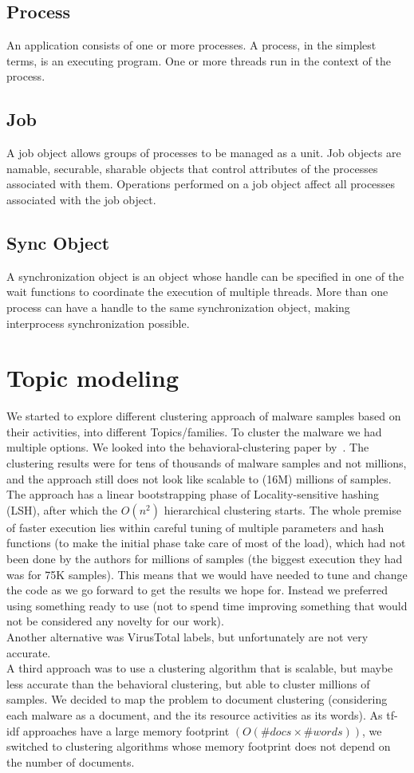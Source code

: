 \subsection{Process}
\label{sub:Process}
An application consists of one or more processes.
A process, in the simplest terms, is an executing program.
One or more threads run in the context of the process.
\subsection{Job}
\label{sub:Job}
A job object allows groups of processes to be managed as a unit.
Job objects are namable, securable, sharable objects that control attributes of the processes associated with them.
Operations performed on a job object affect all processes associated with the job object.
\subsection{Sync Object}
\label{sub:Sync Object}
A synchronization object is an object whose handle can be specified in one of the wait functions to coordinate the execution of multiple threads.
More than one process can have a handle to the same synchronization object, making interprocess synchronization possible.


\section{Topic modeling}
\label{sec:Topic model}
We started to explore different clustering approach of malware samples based on their activities, into different Topics/families.
To cluster the malware we had multiple options. We looked into the behavioral-clustering paper by~\cite[Bayer]{bayer}.
The clustering results were for tens of thousands of malware samples and not millions, and the approach still does not look like scalable to (16M) millions of samples.
The approach has a linear bootstrapping phase of Locality-sensitive hashing (LSH), after which the $O(n^2)$ hierarchical clustering starts.
The whole premise of faster execution lies within careful tuning of multiple parameters and hash functions (to make the initial phase take care of most of the load), which had not been done by the authors for millions of samples (the biggest execution they had was for 75K samples).
This means that we would have needed to tune and change the code as we go forward to get the results we hope for.
Instead we preferred using something ready to use (not to spend time improving something that would not be considered any novelty for our work).
\\
Another alternative was VirusTotal labels, but unfortunately are not very accurate.
\\
A third approach was to use a clustering algorithm that is scalable, but maybe less accurate than the behavioral clustering, but able to cluster millions of samples.
We decided to map the problem to document clustering (considering each malware as a document, and the its resource activities as its words).
As {tf-idf} approaches have a large memory footprint $(O(\#docs \times \#words))$, we switched to clustering algorithms whose memory footprint does not depend on the number of documents.
\\
